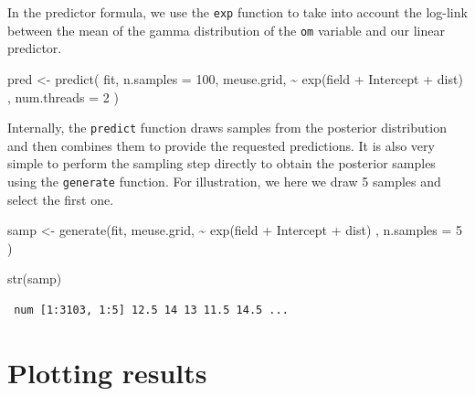 \documentclass[
  a4paper,
]{article}
\newenvironment{Shaded}{\begin{snugshade}}{\end{snugshade}}
\newcommand{\AttributeTok}[1]{\textcolor[rgb]{0.40,0.45,0.13}{#1}}
\newcommand{\DecValTok}[1]{\textcolor[rgb]{0.68,0.00,0.00}{#1}}
\newcommand{\FunctionTok}[1]{\textcolor[rgb]{0.28,0.35,0.67}{#1}}
\newcommand{\NormalTok}[1]{\textcolor[rgb]{0.00,0.23,0.31}{#1}}
\newcommand{\OtherTok}[1]{\textcolor[rgb]{0.00,0.23,0.31}{#1}}
\newcommand{\SpecialCharTok}[1]{\textcolor[rgb]{0.37,0.37,0.37}{#1}}
\begin{document}
In the predictor formula, we use the \texttt{exp} function to take into
account the log-link between the mean of the gamma distribution of the
\texttt{om} variable and our linear predictor.

\begin{Shaded}
\begin{Highlighting}[]
\NormalTok{pred }\OtherTok{\textless{}{-}} \FunctionTok{predict}\NormalTok{(}
\NormalTok{  fit,}
  \AttributeTok{n.samples =} \DecValTok{100}\NormalTok{,}
\NormalTok{  meuse.grid,}
  \SpecialCharTok{\textasciitilde{}} \FunctionTok{exp}\NormalTok{(field }\SpecialCharTok{+}\NormalTok{ Intercept }\SpecialCharTok{+}\NormalTok{ dist) ,}
  \AttributeTok{num.threads =} \DecValTok{2}
\NormalTok{)}
\end{Highlighting}
\end{Shaded}

Internally, the \texttt{predict} function draws samples from the
posterior distribution and then combines them to provide the requested
predictions. It is also very simple to perform the sampling step
directly to obtain the posterior samples using the \texttt{generate}
function. For illustration, we here we draw 5 samples and select the
first one.

\begin{Shaded}
\begin{Highlighting}[]
\NormalTok{samp }\OtherTok{\textless{}{-}} \FunctionTok{generate}\NormalTok{(fit, }
\NormalTok{                 meuse.grid,}
                 \SpecialCharTok{\textasciitilde{}} \FunctionTok{exp}\NormalTok{(field }\SpecialCharTok{+}\NormalTok{ Intercept }\SpecialCharTok{+}\NormalTok{ dist) ,}
                 \AttributeTok{n.samples =} \DecValTok{5}
\NormalTok{)}

\FunctionTok{str}\NormalTok{(samp)}
\end{Highlighting}
\end{Shaded}

\begin{verbatim}
 num [1:3103, 1:5] 12.5 14 13 11.5 14.5 ...
\end{verbatim}

\begin{Shaded}
\end{Shaded}

\hypertarget{plotting-results}{%
\section{Plotting results}\label{plotting-results}}
\end{document}
